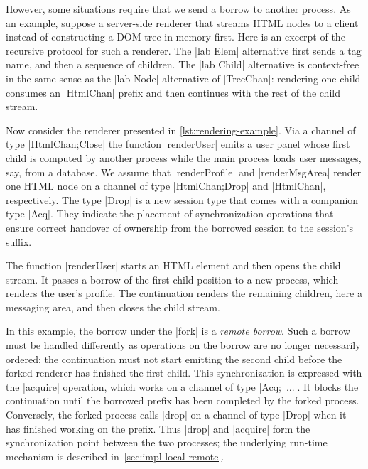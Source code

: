 However, some situations require that we send a borrow to
another process. As an example, suppose a server-side renderer that streams
HTML nodes to a client instead of constructing a DOM tree in
memory first. Here is an excerpt of the recursive protocol for such a renderer.
%
{\TightCode[\smallskipamount]\HtmlProtocolDefn}
%
\noindent The |lab Elem| alternative first sends a tag name, and then a sequence
of children. The |lab Child| alternative is context-free in the same sense as
the |lab Node| alternative of |TreeChan|: rendering one child consumes an
|HtmlChan| prefix and then continues with the rest of the child stream.

\begin{Listing}
  \linenoon
  \linenoreset
  \TightCode
  \CodeRenderExample
  \caption{Rendering example}
  \label{lst:rendering-example}
\end{Listing}

Now consider the renderer presented in \cref{lst:rendering-example}. Via a
channel of type |HtmlChan;Close| the function  |renderUser| emits a user panel
whose first child is computed by another process while the main process loads
user messages, say, from a database. We assume that |renderProfile| and
|renderMsgArea| render one HTML node on a channel of type |HtmlChan;Drop| and
|HtmlChan|, respectively. The type |Drop| is a new session type that comes with
a companion type |Acq|. They indicate the placement of synchronization
operations that ensure correct handover of ownership from the borrowed session
to the session's suffix.

The function |renderUser| starts an HTML element and then opens the child
stream. It passes a borrow of the first child position to a new process, which
renders the user's profile.  The continuation renders the remaining children,
here a messaging area, and then closes the child stream.

In this example, the borrow under the |fork| is a \emph{remote borrow}. Such a
borrow must be handled differently as operations on the borrow are no longer
necessarily ordered: the continuation must not start emitting the second child
before the forked renderer has finished the first child. This synchronization is
expressed with the |acquire| operation, which works on a channel of type
\mbox{|Acq; ...|.} It blocks the continuation until the borrowed prefix has been
completed by the forked process. Conversely, the forked process calls |drop| on
a channel of type |Drop| when it has finished working on the prefix. Thus |drop|
and |acquire| form the synchronization point between the two processes; the
underlying run-time mechanism is described in~\cref{sec:impl-local-remote}.

